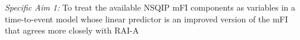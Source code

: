 \emph{Specific Aim 1:} To treat the available NSQIP mFI components as variables in a time-to-event model whose linear predictor is an improved version of the mFI that agrees more closely with RAI-A